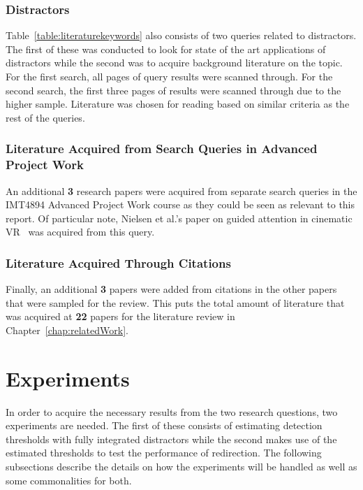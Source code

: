 \subsubsection{Distractors}
Table~\ref{table:literaturekeywords} also consists of two queries related to distractors. The first of these was conducted to look for state of the art applications of distractors while the second was to acquire background literature on the topic. For the first search, all pages of query results were scanned through. For the second search, the first three pages of results were scanned through due to the higher sample. Literature was chosen for reading based on similar criteria as the rest of the queries.
       
\subsubsection{Literature Acquired from Search Queries in Advanced Project Work}
An additional \textbf{3} research papers were acquired from separate search queries in the IMT4894 Advanced Project Work course as they could be seen as relevant to this report. Of particular note, Nielsen et al.'s paper on guided attention in cinematic VR~\cite{nielsen2016missing} was acquired from this query. 

\subsubsection{Literature Acquired Through Citations}
Finally, an additional \textbf{3} papers were added from citations in the other papers that were sampled for the review. This puts the total amount of literature that was acquired at \textbf{22} papers for the literature review in Chapter~\ref{chap:relatedWork}.

\section{Experiments}
In order to acquire the necessary results from the two research questions, two experiments are needed. The first of these consists of estimating detection thresholds with fully integrated distractors while the second makes use of the estimated thresholds to test the performance of redirection. The following subsections describe the details on how the experiments will be handled as well as some commonalities for both. 

